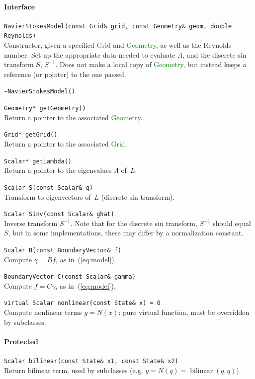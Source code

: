 \documentclass[11pt]{article}
\def\class#1{\textcolor{green}{\ttfamily\small #1}} %
\let\code\lstinline
\begin{document}
\paragraph{Interface}
\begin{description}
	\item \code|NavierStokesModel(const Grid& grid, const Geometry& geom, double Reynolds)|\\
		Constructor, given a specified \class{Grid} and \class{Geometry}, as well as the Reynolds number.  Set up the appropriate data needed to evaluate $\Lambda$, and the discrete sin transform $S$, $S^{-1}$.  Does not make a local copy of \class{Geometry}, but instead keeps a reference (or pointer) to the one passed.
	\item \code|~NavierStokesModel()|\\
	\item \code|Geometry* getGeometry()|\\
		Return a pointer to the associated \class{Geometry}.
	\item \code|Grid* getGrid()|\\
		Return a pointer to the associated \class{Grid}.
	\item \code|Scalar* getLambda()|\\
		Return a pointer to the eigenvalues $\Lambda$ of~$L$.
	\item \code|Scalar S(const Scalar& g)|\\
		Transform to eigenvectors of~$L$ (discrete sin transform).
	\item \code|Scalar Sinv(const Scalar& ghat)|\\
		Inverse transform $S^{-1}$.  Note that for the discrete sin transform, $S^{-1}$ should equal~$S$, but in some implementations, these may differ by a normalization constant.
	\item \code|Scalar B(const BoundaryVector& f)|\\
		Compute $\gamma = Bf$, as in~(\ref{eq:model}).
	\item \code|BoundaryVector C(const Scalar& gamma)|\\
		Compute $f = C\gamma$, as in~(\ref{eq:model}).
	\item \code|virtual Scalar nonlinear(const State& x) = 0|\\
		Compute nonlinear terms $y = N(x)$: pure virtual function, must be overridden by subclasses.
\end{description}

\paragraph{Protected}
\begin{description}
	\item \code|Scalar bilinear(const State& x1, const State& x2)|\\
		Return bilinear term, used by subclasses (e.g. $y = N(q)=\operatorname{bilinear}(q,q)$).
\end{description}
\end{document}

